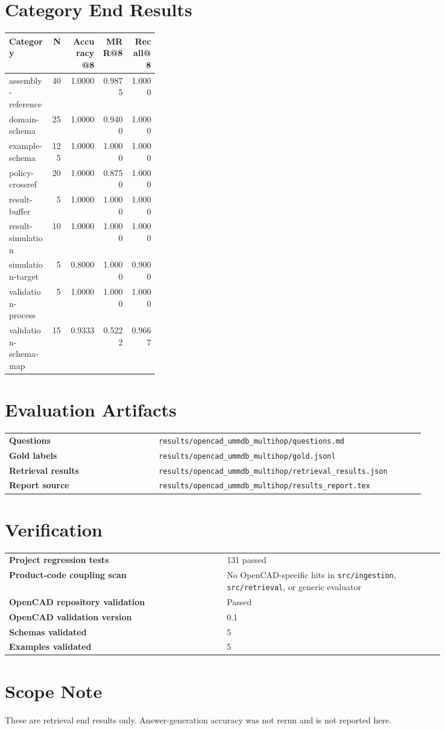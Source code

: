 \documentclass[11pt]{article}
\begin{document}
\section*{Category End Results}
\begin{longtable}{>{\ttfamily}p{0.29\linewidth}rrrr}
\toprule
\normalfont Category & N & Accuracy@8 & MRR@8 & Recall@8 \\
\midrule
\endhead
assembly-reference & 40 & 1.0000 & 0.9875 & 1.0000 \\
domain-schema & 25 & 1.0000 & 0.9400 & 1.0000 \\
example-schema & 125 & 1.0000 & 1.0000 & 1.0000 \\
policy-crossref & 20 & 1.0000 & 0.8750 & 1.0000 \\
result-buffer & 5 & 1.0000 & 1.0000 & 1.0000 \\
result-simulation & 10 & 1.0000 & 1.0000 & 1.0000 \\
simulation-target & 5 & 0.8000 & 1.0000 & 0.9000 \\
validation-process & 5 & 1.0000 & 1.0000 & 1.0000 \\
validation-schema-map & 15 & 0.9333 & 0.5222 & 0.9667 \\
\bottomrule
\end{longtable}

\section*{Evaluation Artifacts}
\begin{tabular}{>{\bfseries}p{0.32\linewidth}p{0.58\linewidth}}
Questions & \texttt{results/opencad\_ummdb\_multihop/questions.md} \\
Gold labels & \texttt{results/opencad\_ummdb\_multihop/gold.jsonl} \\
Retrieval results & \texttt{results/opencad\_ummdb\_multihop/retrieval\_results.json} \\
Report source & \texttt{results/opencad\_ummdb\_multihop/results\_report.tex} \\
\end{tabular}

\section*{Verification}
\begin{tabular}{>{\bfseries}p{0.42\linewidth}p{0.42\linewidth}}
Project regression tests & 131 passed \\
Product-code coupling scan & No OpenCAD-specific hits in \texttt{src/ingestion}, \texttt{src/retrieval}, or generic evaluator \\
OpenCAD repository validation & Passed \\
OpenCAD validation version & 0.1 \\
Schemas validated & 5 \\
Examples validated & 5 \\
\end{tabular}

\section*{Scope Note}
These are retrieval end results only. Answer-generation accuracy was not rerun and is not reported here.
\end{document}
